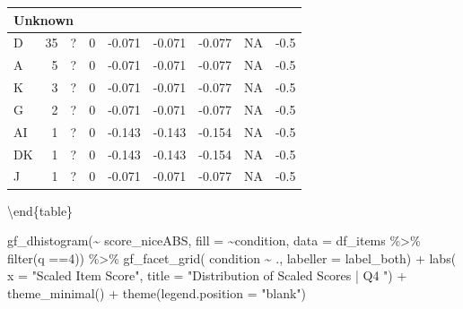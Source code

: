\documentclass[
  letterpaper,
  DIV=11,
  numbers=noendperiod]{scrreprt}
\newenvironment{Shaded}{\begin{snugshade}}{\end{snugshade}}
\newcommand{\AttributeTok}[1]{\textcolor[rgb]{0.40,0.45,0.13}{#1}}
\newcommand{\DecValTok}[1]{\textcolor[rgb]{0.68,0.00,0.00}{#1}}
\newcommand{\FunctionTok}[1]{\textcolor[rgb]{0.28,0.35,0.67}{#1}}
\newcommand{\NormalTok}[1]{\textcolor[rgb]{0.00,0.23,0.31}{#1}}
\newcommand{\SpecialCharTok}[1]{\textcolor[rgb]{0.37,0.37,0.37}{#1}}
\newcommand{\StringTok}[1]{\textcolor[rgb]{0.13,0.47,0.30}{#1}}
\begin{document}
\begin{tabular}[t]{l|r|l|r|r|r|r|r|r}
\hline
\multicolumn{9}{l}{\textbf{Unknown}}\\
\hline
\hspace{1em}D & 35 & ? & 0 & -0.071 & -0.071 & -0.077 & NA & -0.5\\
\hline
\hspace{1em}A & 5 & ? & 0 & -0.071 & -0.071 & -0.077 & NA & -0.5\\
\hline
\hspace{1em}K & 3 & ? & 0 & -0.071 & -0.071 & -0.077 & NA & -0.5\\
\hline
\hspace{1em}G & 2 & ? & 0 & -0.071 & -0.071 & -0.077 & NA & -0.5\\
\hline
\hspace{1em}AI & 1 & ? & 0 & -0.143 & -0.143 & -0.154 & NA & -0.5\\
\hline
\hspace{1em}DK & 1 & ? & 0 & -0.143 & -0.143 & -0.154 & NA & -0.5\\
\hline
\hspace{1em}J & 1 & ? & 0 & -0.071 & -0.071 & -0.077 & NA & -0.5\\
\hline
\end{tabular}

\textbackslash end\{table\}

\begin{Shaded}
\begin{Highlighting}[]
\FunctionTok{gf\_dhistogram}\NormalTok{(}\SpecialCharTok{\textasciitilde{}}\NormalTok{ score\_niceABS, }\AttributeTok{fill =} \SpecialCharTok{\textasciitilde{}}\NormalTok{condition, }\AttributeTok{data =}\NormalTok{ df\_items }\SpecialCharTok{\%\textgreater{}\%} \FunctionTok{filter}\NormalTok{(q }\SpecialCharTok{==}\DecValTok{4}\NormalTok{)) }\SpecialCharTok{\%\textgreater{}\%} 
  \FunctionTok{gf\_facet\_grid}\NormalTok{( condition }\SpecialCharTok{\textasciitilde{}}\NormalTok{ ., }\AttributeTok{labeller =}\NormalTok{ label\_both) }\SpecialCharTok{+} 
  \FunctionTok{labs}\NormalTok{( }\AttributeTok{x =} \StringTok{"Scaled Item Score"}\NormalTok{, }\AttributeTok{title =} \StringTok{"Distribution of Scaled Scores | Q4 "}\NormalTok{) }\SpecialCharTok{+} 
  \FunctionTok{theme\_minimal}\NormalTok{() }\SpecialCharTok{+} \FunctionTok{theme}\NormalTok{(}\AttributeTok{legend.position =} \StringTok{"blank"}\NormalTok{)}
\end{Highlighting}
\end{Shaded}
\end{document}
